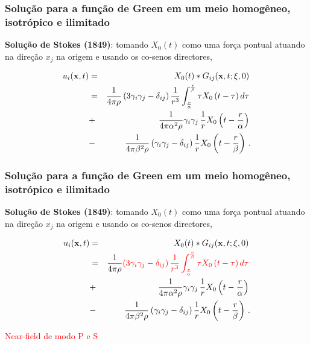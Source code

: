 \documentclass[xcolor=table]{beamer}
\newcommand{\xvec}{\mathbf{x}}
\newcommand{\xivec}{\boldmath \xi}
\begin{document}
\begin{frame}
\frametitle{\textbf{Solu\c{c}\~ao para a fun\c{c}\~ao de Green em um meio homog\^eneo, isotr\'opico e ilimitado}}

\begin{flushleft}
\textbf{Solu\c{c}\~ao de Stokes (1849)}: tomando $X_{0}(t)$ como uma for\c{c}a pontual atuando na dire\c{c}\~ao $x_j$ na origem e usando os co-senos 
directores,
\end{flushleft}
\begin{eqnarray*}
  \label{ten1}
       u_i(\xvec,t) &=& X_{0}(t) * G_{ij}(\xvec,t;\xivec,0)\, \\
       &=&\frac{1}{4\pi\rho} \left(3\gamma_i\gamma_j -\delta_{ij} \right) \frac{1}{r^3}  \int_{ \frac{r }{\alpha}}^{ \frac{r}{\beta}} \tau X_{0}\left( t -\tau \right)  d\tau\, \\      
       &+&\frac{1}{4\pi\alpha^2\rho} \gamma_i\gamma_j \,\frac{1}{r}  X_{0}\left(t - \frac{r}{\alpha} \right)\, \\
       &-&\frac{1}{4\pi\beta^2\rho} \left(\gamma_i\gamma_j -\delta_{ij} \right)  \frac{1}{r}  X_{0}\left(t - \frac{r}{\beta} \right)\, .
\end{eqnarray*}
\begin{flushleft}
\end{flushleft}
\end{frame}%



\begin{frame}
\frametitle{\textbf{Solu\c{c}\~ao para a fun\c{c}\~ao de Green em um meio homog\^eneo, isotr\'opico e ilimitado}}

\begin{flushleft}
\textbf{Solu\c{c}\~ao de Stokes (1849)}: tomando $X_{0}(t)$ como uma for\c{c}a pontual atuando na dire\c{c}\~ao $x_j$ na origem e usando os co-senos 
directores,
\end{flushleft}
\begin{eqnarray*}
  \label{ten1}
       u_i(\xvec,t) &=& X_{0}(t) * G_{ij}(\xvec,t;\xivec,0)\, \\
       &=&\frac{1}{4\pi\rho} \textcolor{red}{\left(3\gamma_i\gamma_j -\delta_{ij} \right) \frac{1}{r^3}  \int_{ \frac{r }{\alpha}}^{ \frac{r}{\beta}} \tau X_{0}\left( t -\tau \right)  d\tau }\, \\      
       &+&\frac{1}{4\pi\alpha^2\rho} \gamma_i\gamma_j \,\frac{1}{r}  X_{0}\left(t - \frac{r}{\alpha} \right)\, \\
       &-&\frac{1}{4\pi\beta^2\rho} \left(\gamma_i\gamma_j -\delta_{ij} \right)  \frac{1}{r}  X_{0}\left(t - \frac{r}{\beta} \right)\, .
\end{eqnarray*}
\begin{flushleft}
\textcolor{red}{Near-field de modo P e S}
\end{flushleft}
\end{frame}%
\end{document}
